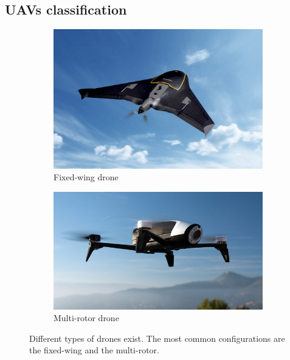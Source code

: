 \subsection{\glspl{UAV} classification}

\begin{figure}
\centering
\begin{subfigure}{.5\textwidth}
  \centering
  \includegraphics[width=.9\linewidth]{images/fixed-wings-drone.png}
  \caption{Fixed-wing drone}
  \label{fig:uav-fixed-wing}
\end{subfigure}%
\begin{subfigure}{.5\textwidth}
  \centering
  \includegraphics[width=.9\linewidth]{images/quadrotor.jpg}
  \caption{Multi-rotor drone}
  \label{fig:uav-rotor}
\end{subfigure}
\caption{Different types of drones exist. The most common configurations are the fixed-wing and the multi-rotor.}
\label{fig:uav-types}
\end{figure}

